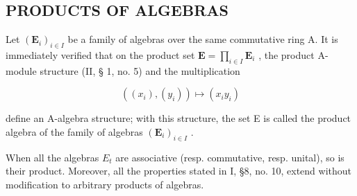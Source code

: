 \subsection{PRODUCTS OF ALGEBRAS}

Let \((\mathbf{E}_i)_{i\in I}\) be a family of algebras over the same commutative ring A. It is immediately verified that on the product set \(\mathbf{E} = \prod_{i\in I}\mathbf{E}_i\) , the product A-module structure (II, § 1, no. 5) and the multiplication

\[
\left(\left(x _ {i}\right), \left(y _ {i}\right)\right) \mapsto \left(x _ {i} y _ {i}\right)\tag{4}
\]

define an A-algebra structure; with this structure, the set E is called the product algebra of the family of algebras \((\mathbf{E}_{i})_{i\in I}\) .

When all the algebras \(E_{t}\) are associative (resp. commutative, resp. unital), so is their product. Moreover, all the properties stated in I, §8, no. 10, extend without modification to arbitrary products of algebras.

